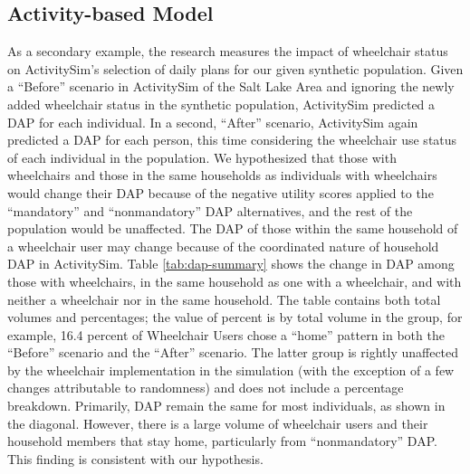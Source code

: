 \documentclass[3p, authoryear, review]{elsarticle} %
\begin{document}
\hypertarget{activity-based-model}{%
\subsection{Activity-based Model}\label{activity-based-model}}

As a secondary example, the research measures the impact of
wheelchair status on ActivitySim's selection of daily plans for our given
synthetic population. Given a ``Before'' scenario in ActivitySim of the Salt Lake
Area and ignoring the newly added wheelchair status in the synthetic population,
ActivitySim predicted a DAP for each individual. In a second, ``After'' scenario,
ActivitySim again predicted a DAP for each person, this time considering the
wheelchair use status of each individual in the population. We hypothesized that
those with wheelchairs and those in the same households as individuals with
wheelchairs would change their DAP because of the negative utility scores
applied to the ``mandatory'' and ``nonmandatory'' DAP alternatives, and the rest of
the population would be unaffected. The DAP of those within the same household
of a wheelchair user may change because of the coordinated nature of household
DAP in ActivitySim. Table \ref{tab:dap-summary} shows the change in DAP among those with
wheelchairs, in the same household as one with a wheelchair, and with neither a
wheelchair nor in the same household. The table contains both total volumes and
percentages; the value of percent is by total volume in the group, for example,
16.4 percent of Wheelchair Users chose a ``home'' pattern in both the ``Before''
scenario and the ``After'' scenario. The latter group is rightly unaffected by
the wheelchair implementation in the simulation (with the exception of a few
changes attributable to randomness) and does not include a percentage breakdown.
Primarily, DAP remain the same for most individuals, as shown in the diagonal.
However, there is a large volume of wheelchair users and their household members
that stay home, particularly from ``nonmandatory'' DAP. This finding is consistent
with our hypothesis.
\end{document}
